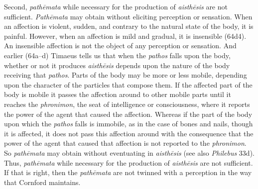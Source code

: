 Second, \emph{pathēmata} while necessary for the production of \emph{aisthēsis} are not sufficient. \emph{Pathēmata} may obtain without eliciting perception or sensation. When an affection is violent, sudden, and contrary to the natural state of the body, it is painful. However, when an affection is mild and gradual, it is insensible (64d4). An insensible affection is not the object of any perception or sensation. And earlier (64a--d) Timaeus tells us that when the \emph{pathos} falls upon the body, whether or not it produces \emph{aisthēsis} depends upon the nature of the body receiving that \emph{pathos}. Parts of the body may be more or less mobile, depending upon the character of the particles that compose them. If the affected part of the body is mobile it passes the affection around to other mobile parts until it reaches the \emph{phronimon}, the seat of intelligence or consciousness, where it reports the power of the agent that caused the affection. Whereas if the part of the body upon which the \emph{pathos} falls is immobile, as in the case of bones and nails, though it is affected, it does not pass this affection around with the consequence that the power of the agent that caused that affection is not reported to the \emph{phronimon}. So \emph{pathēmata} may obtain without eventuating in \emph{aisthēsis} (see also \emph{Philebus} 33d). Thus, \emph{pathēmata} while necessary for the production of \emph{aisthēsis} are not sufficient. If that is right, then the \emph{pathēmata} are not twinned with a perception in the way that Cornford maintains.

